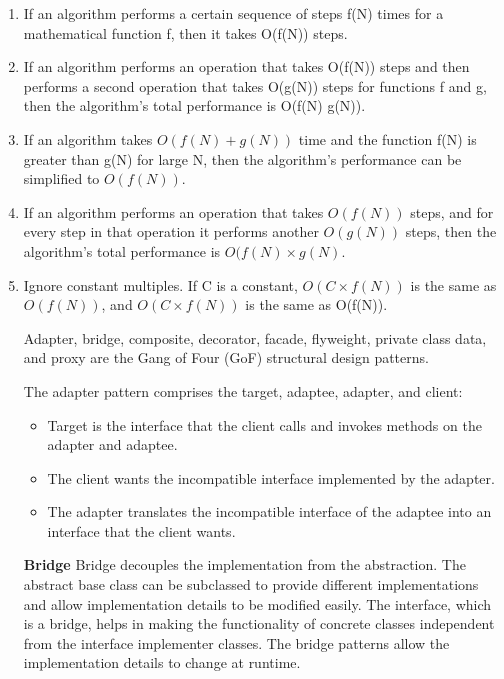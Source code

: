 \begin{enumerate}
\item If an algorithm performs a certain sequence of steps f(N) times for a mathematical function f, then it takes O(f(N)) steps.
\item  If an algorithm performs an operation that takes O(f(N)) steps and then
performs a second operation that takes O(g(N)) steps for functions f and
g, then the algorithm’s total performance is O(f(N) g(N)).
\item  If an algorithm takes $O(f(N)+g(N))$ time and the function f(N) is greater
than g(N) for large N, then the algorithm’s performance can be simplified
to $O(f(N))$.
\item  If an algorithm performs an operation that takes $O(f(N))$ steps, and for
every step in that operation it performs another $O(g(N))$ steps, then the
algorithm’s total performance is $O(f(N)\times g(N)$.
\item  Ignore constant multiples. If C is a constant, $O(C \times f(N))$ is the same as
$O(f(N))$, and $O(C \times f(N))$ is the same as O(f(N)).

Adapter, bridge, composite,
decorator, facade, flyweight, private class data, and proxy are the
Gang of Four (GoF) structural design patterns. 

The adapter pattern comprises the target, adaptee, adapter, and
client:
\begin{itemize}
\item Target is the interface that the client calls and invokes
methods on the adapter and adaptee.
\item The client wants the incompatible interface implemented
by the adapter.
\item The adapter translates the incompatible interface of the
adaptee into an interface that the client wants.
\end{itemize}



\textbf{Bridge}
Bridge decouples the implementation from the abstraction. The
abstract base class can be subclassed to provide different
implementations and allow implementation details to be
modified easily. The interface, which is a bridge, helps in making
the functionality of concrete classes independent from the
interface implementer classes. The bridge patterns allow the
implementation details to change at runtime.





\end{enumerate}
